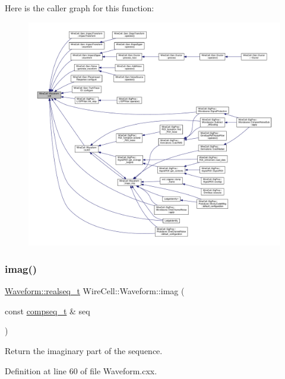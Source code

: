 Here is the caller graph for this function\+:
\nopagebreak
\begin{figure}[H]
\begin{center}
\leavevmode
\includegraphics[width=350pt]{namespace_wire_cell_1_1_waveform_a69255dad704fcb71fa53745e90a2f0e1_icgraph}
\end{center}
\end{figure}
\mbox{\label{namespace_wire_cell_1_1_waveform_acc803e535b3e979dc331088b9fba8bc1}} 
\subsubsection{\texorpdfstring{imag()}{imag()}}
{\footnotesize\ttfamily \hyperlink{namespace_wire_cell_1_1_waveform_a479175e541c8545e87cd8063b74b6956}{Waveform\+::realseq\+\_\+t} Wire\+Cell\+::\+Waveform\+::imag (\begin{DoxyParamCaption}\item[{const \hyperlink{namespace_wire_cell_1_1_waveform_a7e4a8d371f774438bb360e7d1dcb583a}{compseq\+\_\+t} \&}]{seq }\end{DoxyParamCaption})}



Return the imaginary part of the sequence. 



Definition at line 60 of file Waveform.\+cxx.

